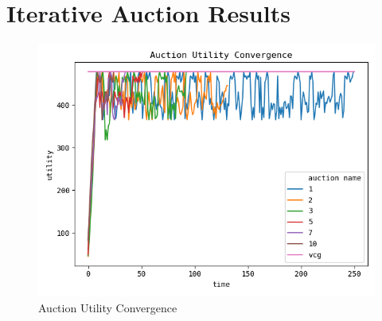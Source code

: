 \section{Iterative Auction Results}\label{sec:auction-results}
\begin{figure}[H]
    \centering
    \includegraphics{../results/auction_utility_convergence.png}
    \caption{Auction Utility Convergence}
\end{figure}

